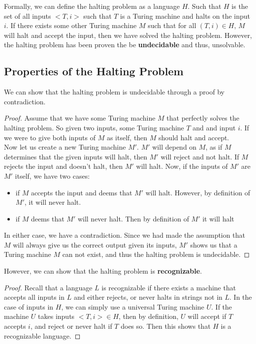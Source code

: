 \documentclass[12pt, letterpaper]{article}
\begin{document}
Formally, we can define the halting problem as a language $H$. Such that $H$ is the set of all inputs $<T,i>$ such that $T$ is a Turing machine and halts on the input $i$. If there exists some other Turing machine $M$ such that for all $(T, i) \in H$, $M$ will halt and accept the input, then we have solved the halting problem. However, the halting problem has been proven the be \textbf{undecidable} and thus, unsolvable.


\subsection{Properties of the Halting Problem}

We can show that the halting problem is undecidable through a proof by contradiction.
\begin{proof}
Assume that we have some Turing machine $M$ that perfectly solves the halting problem. So given two inputs, some Turing machine $T$ and and input $i$. If we were to give both inputs of $M$ as itself, then $M$ should halt and accept.\\

Now let us create a new Turing machine $M'$. $M'$ will depend on $M$, as if $M$ determines that the given inputs will halt, then $M'$ will reject and not halt. If $M$ rejects the input and doesn't halt, then $M'$ will halt. Now, if the inputs of $M'$ are $M'$ itself, we have two cases:
\begin{itemize}
\item if $M$ accepts the input and deems that $M'$ will halt. However, by definition of $M'$, it will never halt.
\item if $M$ deems that $M'$ will never halt. Then by definition of $M'$ it will halt
\end{itemize}
In either case, we have a contradiction. Since we had made the assumption that $M$ will always give us the correct output given its inputs, $M'$ shows us that a Turing machine $M$ can not exist, and thus the halting problem is undecidable.
\end{proof}

However, we can show that the halting problem is \textbf{recognizable}.
\begin{proof}
Recall that a language $L$ is recognizable if there exists a machine that accepts all inputs in $L$ and either rejects, or never halts in strings not in $L$. In the case of inputs in $H$, we can simply use a universal Turing machine $U$. If the machine $U$ takes inputs $<T,i> \in H$, then by definition, $U$ will accept if $T$ accepts $i$, and reject or never halt if $T$ does so. Then this shows that $H$ is a recognizable language.
\end{proof}
\end{document}
